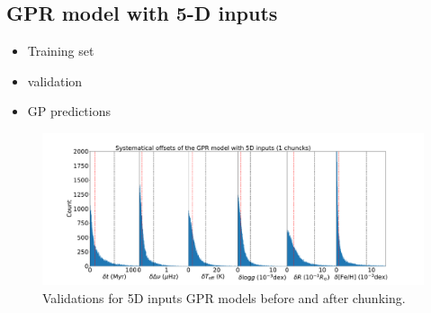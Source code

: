 \subsection{GPR model with 5-D inputs}
\begin{itemize}
\item Training set 
\item validation 
\item GP predictions
\end{itemize}
\begin{figure}
	\includegraphics[width=1.0\columnwidth]{5d_validation_x.pdf}
    \caption{Validations for 5D inputs GPR models before and after chunking.}
    \label{fig:4d_vali1}
\end{figure}



